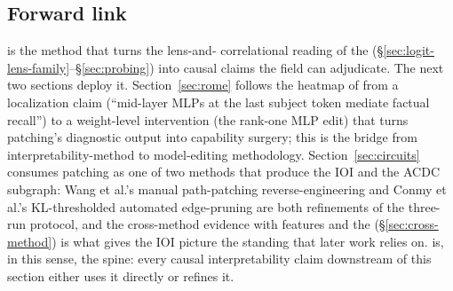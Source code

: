 \subsection{Forward link}
\label{sec:patching-forward}

 is the method that turns the lens-and-
correlational reading of the 
(\S\ref{sec:logit-lens-family}--\S\ref{sec:probing}) into causal claims
the field can adjudicate. The next two sections deploy it.
Section~\ref{sec:rome} follows the heatmap of
\citet[Fig.~1]{meng2022-rome} from a localization claim
(``mid-layer MLPs at the last subject token mediate factual recall'')
to a weight-level intervention (the rank-one MLP edit) that turns
patching's diagnostic output into capability surgery; this is the
bridge from interpretability-method to model-editing
methodology. Section~\ref{sec:circuits} consumes patching as one of two
methods that produce the IOI  and the ACDC subgraph: Wang et
al.'s manual path-patching reverse-engineering and Conmy et al.'s
KL-thresholded automated edge-pruning are both refinements of the
three-run protocol, and the cross-method evidence with  features
and the  (\S\ref{sec:cross-method}) is what gives the IOI
picture the standing that later work relies on.  is, in this
sense, the spine: every causal interpretability claim downstream of
this section either uses it directly or refines it.
